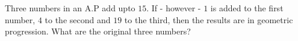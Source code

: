 
%
%
%
%
% 
% 

\question[4] Three numbers in an A.P add upto $15$. If - however - $1$ is added to the first number,
$4$ to the second and $19$ to the third, then the results are in geometric progression. What are 
the original three numbers?


\ifprintanswers

\fi 

